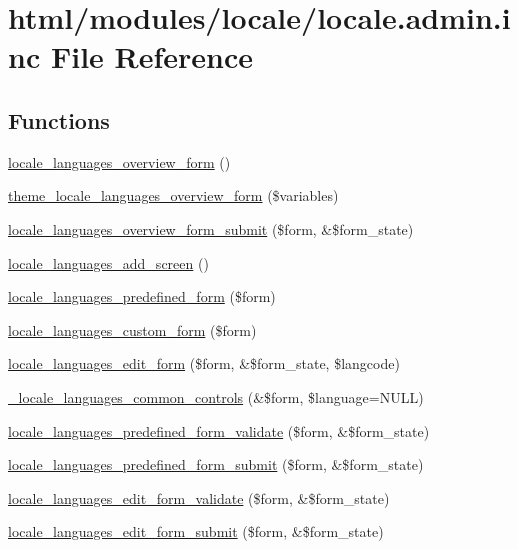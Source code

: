 \hypertarget{locale_8admin_8inc}{
\section{html/modules/locale/locale.admin.inc File Reference}
\label{locale_8admin_8inc}
}
\subsection*{Functions}
\begin{DoxyCompactItemize}
\item 
\hyperlink{group__locale_ga6cdda3c5c776e4c263ace510317cdeed}{locale\_\-languages\_\-overview\_\-form} ()
\item 
\hyperlink{group__themeable_ga3e850294586d271065fce8ed9bf7af90}{theme\_\-locale\_\-languages\_\-overview\_\-form} (\$variables)
\item 
\hyperlink{group__locale_ga957be3bb6cd02af2ff2acd887fc2b3fe}{locale\_\-languages\_\-overview\_\-form\_\-submit} (\$form, \&\$form\_\-state)
\item 
\hyperlink{group__locale_ga717959709d412fc1039f7436501dbf49}{locale\_\-languages\_\-add\_\-screen} ()
\item 
\hyperlink{group__locale_ga06a3fbf820480d99d755aee5ae6a74dc}{locale\_\-languages\_\-predefined\_\-form} (\$form)
\item 
\hyperlink{group__locale_ga38e919c4e98aba3e12136c2ac35b92f3}{locale\_\-languages\_\-custom\_\-form} (\$form)
\item 
\hyperlink{group__locale_ga32b1bc378b3343f57cf3632acd8701f6}{locale\_\-languages\_\-edit\_\-form} (\$form, \&\$form\_\-state, \$langcode)
\item 
\hyperlink{group__locale_gaa662af294a8422d2b73e6e05288b1b8d}{\_\-locale\_\-languages\_\-common\_\-controls} (\&\$form, \$language=NULL)
\item 
\hyperlink{group__locale_ga4298724abc57b7d2622a2c9642b4f742}{locale\_\-languages\_\-predefined\_\-form\_\-validate} (\$form, \&\$form\_\-state)
\item 
\hyperlink{group__locale_ga83df19c32a63b094d033d0802d74d7cd}{locale\_\-languages\_\-predefined\_\-form\_\-submit} (\$form, \&\$form\_\-state)
\item 
\hyperlink{group__locale_ga0d97a3815fcd49bb49ed59dc77ebb802}{locale\_\-languages\_\-edit\_\-form\_\-validate} (\$form, \&\$form\_\-state)
\item 
\hyperlink{group__locale_ga749200a912dbb5d31c5403d3fd909741}{locale\_\-languages\_\-edit\_\-form\_\-submit} (\$form, \&\$form\_\-state)

\end{DoxyCompactItemize}
